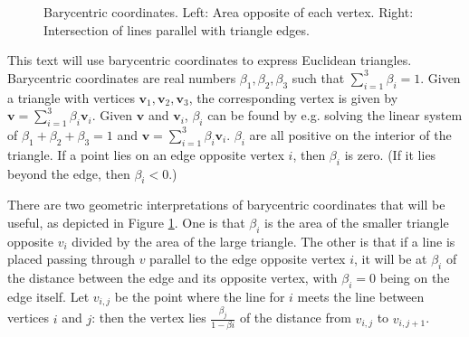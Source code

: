 \documentclass{amsart}[12pt]
\begin{document}
\begin{figure}[!htbp]
\caption{Barycentric coordinates. Left: Area opposite of each vertex. Right: Intersection of lines parallel with triangle edges.}
\label{fig:bary}
\end{figure}

This text will use barycentric coordinates to express Euclidean triangles.
Barycentric coordinates are real numbers $\beta_1, \beta_2, \beta_3$ such that
$\sum^3_{i=1} \beta_i = 1$. Given a triangle with vertices $\mathbf v_1,
\mathbf v_2, \mathbf v_3$, the corresponding vertex is given by $\mathbf v =
\sum^3_{i=1} \beta_i \mathbf v_i$. Given $\mathbf v$ and $\mathbf v_i$,
$\beta_i$ can be found by e.g. solving the linear system of
$\beta_1 + \beta_2 + \beta_3 = 1$ and $\mathbf v = \sum^3_{i=1} \beta_i \mathbf
v_i$. $\beta_i$ are all positive on the interior of the triangle. If a point
lies on an edge opposite vertex $i$, then $\beta_i$ is zero.
(If it lies beyond the edge, then $\beta_i < 0$.)

There are two geometric interpretations of barycentric coordinates that will be
useful, as depicted in Figure \ref{fig:bary}. One is that $\beta_i$ is the area
of the smaller triangle opposite $v_i$ divided by the area of the large
triangle. The other is that if a line is placed passing through $v$ parallel to
the edge opposite vertex $i$, it will be at $\beta_i$ of the distance between
the edge and its opposite vertex, with $\beta_i = 0$ being on the edge itself.
Let $v_{i,j}$ be the point where the line for $i$ meets the line between
vertices $i$ and $j$: then the vertex lies $\frac{\beta_{j}}{1-\beta{i}}$
of the distance from $v_{i,j}$ to $v_{i,j+1}$.
\end{document}
